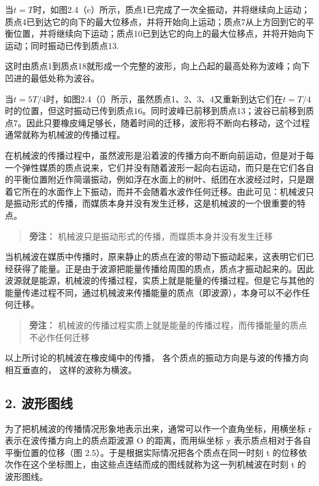当\(t = T\)时，如图2.4（e）所示，质点1已完成了一次全振动，并将继续向上运动；质点4已到达它的向下的最大位移点，并将开始向上运动；质点7从上方回到它的平衡位置，并将继续向下运动；质点10已到达它的向上的最大位移点，并将开始向下运动；同时振动已传到质点13.

这时由质点1到质点18就形成一个完整的波形，向上凸起的最高处称为波峰；向下凹进的最低处称为波谷。

当\(t = 5T / 4\)时，如图2.4（f）所示，虽然质点1、2、3、4又重新到达它们在\(t = T / 4\)时的位置，但这时振动已传到质点16。同时波峰已前移到质点13；波谷已前移到质点7。因此只要橡皮绳足够长，随着时间的迁移，波形将不断向右移动，这个过程通常就称为机械波的传播过程。

在机械波的传播过程中，虽然波形是沿着波的传播方向不断向前运动，但是对于每一个弹性媒质的质点说来，它们并没有随着波形一起向右运动，而只是在它们各自的平衡位置附近作简谐振动，例如浮在水面上的树叶、纸团在水波经过时，只是跟着它所在的水面作上下振动，而并不会随着水波作任何迁移。由此可见：机械波只是振动形式的传播，而媒质本身并没有发生迁移，这是机械波的一个很重要的特点。

\begin{quote}
\textbf{旁注：} 机械波只是振动形式的传播，而媒质本身并没有发生迁移
\end{quote}

当机械波在媒质中传播时，原来静止的质点在波的带动下振动起来，这表明它们已经获得了能量。正是由于波源把能量传播给周围的质点，质点才振动起来的。因此波源就是能源，机械波的传播过程，实质上就是能量的传播过程。但是它与其他的能量传递过程不同，通过机械波来传播能量的质点（即波源），本身可以不必作任何迁移。

\begin{quote}
\textbf{旁注：}
机械波的传播过程实质上就是能量的传播过程，而传播能量的质点不必作任何迁移
\end{quote}

以上所讨论的机械波在橡皮绳中的传播，
各个质点的振动方向是与波的传播方向相互垂直的， 这样的波称为横波。

\subsection{2. 波形图线}\label{ux6ce2ux5f62ux56feux7ebf}

为了把机械波的传播情况形象地表示出来，通常可以作一个直角坐标，用横坐标 r
表示在波传播方向上的质点距波源 O 的距离，而用纵坐标 y
表示质点相对于各自平衡位置的位移（图
2.5）。于是根据实际情况把各个质点在同一时刻 t
的位移依次作在这个坐标图上，由这些点连结而成的图线就称为这一列机械波在时刻
t 的波形图线。

